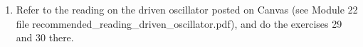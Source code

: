 \documentclass[fleqn]{article}
\begin{document}
\begin{enumerate}
\begin{enumerate}
          \bigbreak

          \textcolor{hwColor}{
            $
              y_c(t)=Ae^{(-\gamma+i\omega_0)t}+Be^{(-\gamma-i\omega_0)t}=e^{-\gamma t}\left[Ae^{i \omega_0 t}+Be^{-i \omega_0 t}\right] \\
              \\
              =e^{-\gamma t}\left[Acos(\omega_0 t)+iAsin(\omega_0 t)+Bcos(\omega_0 t)-iBsin(\omega_0 t)\right] \\
              \\
              =e^{-\gamma t}\left[(A+B)cos(\omega_0 t)+i(A-B)sin(\omega_0 t)\right] \\
              \\
              =L_0 e^{-\gamma t}cos(\omega_0 t+\phi) \\
              \\
              \Longrightarrow \begin{cases}
                \omega_0=\sqrt{\dfrac{c}{a}-(\dfrac{b}{2a})^2} \\
                \\
                \gamma=\dfrac{b}{2a}
              \end{cases}
            $
          }

        \item Exercise 27
        
        \item Exercise 28
      
      \end{enumerate}

    \item Refer to the reading on the driven oscillator posted on Canvas (see Module 22 file recommended\_reading\_driven\_oscillator.pdf), and do the exercises 29 and 30 there. 
          
  \end{enumerate}
\end{document}
